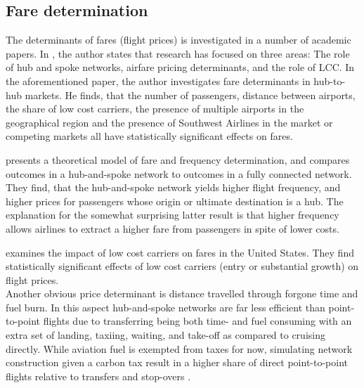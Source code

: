 \subsection{Fare determination}
\label{subsec:b_fare}
The determinants of fares (flight prices) is investigated in a number of academic papers. In \citet{vowles2006airfare}, the author states that research has focused on three areas: The role of hub and spoke networks, airfare pricing determinants, and the role of LCC. In the aforementioned paper, the author investigates fare determinants in hub-to-hub markets. He finds, that the number of passengers, distance between airports, the share of low cost carriers, the presence of multiple airports in the geographical region and the presence of Southwest Airlines in the market or competing markets all have statistically significant effects on fares.
\par
\citet{brueckner2001model} presents a theoretical model of fare and frequency determination, and compares outcomes in a hub-and-spoke network to outcomes in a fully connected network. They find, that the hub-and-spoke network yields higher flight frequency, and higher prices for passengers whose origin or ultimate destination is a hub. The explanation for the somewhat surprising latter result is that higher frequency allows airlines to extract a higher fare from passengers in spite of lower costs.
\par
\citet{abda2012impacts} examines the impact of low cost carriers on fares in the United States. They find statistically significant effects of low cost carriers (entry or substantial growth) on flight prices.  
\medskip\\
Another obvious price determinant is distance travelled through forgone time and fuel burn. In this aspect hub-and-spoke networks are far less efficient than point-to-point flights due to transferring being both time- and fuel consuming with an extra set of landing, taxiing, waiting, and take-off as compared to cruising directly. While aviation fuel is exempted from taxes for now, simulating network construction given a carbon tax result in a higher share of direct point-to-point flights relative to transfers and stop-overs \citep{o2012fuel}.

